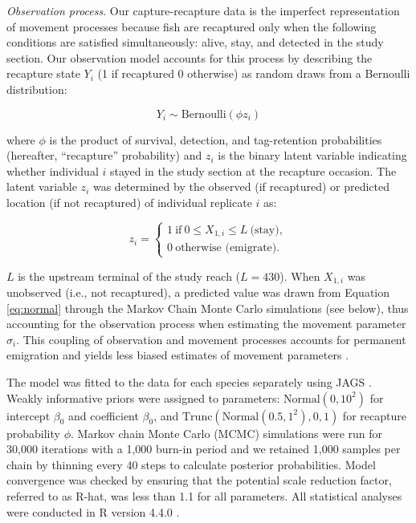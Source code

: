 \documentclass[11pt, class=article, crop=false]{standalone}
\begin{document}
\textit{Observation process}. Our capture-recapture data is the imperfect representation of movement processes because fish are recaptured only when the following conditions are satisfied simultaneously: alive, stay, and detected in the study section. Our observation model accounts for this process by describing the recapture state $Y_i$ (1 if recaptured 0 otherwise) as random draws from a Bernoulli distribution:

\begin{equation}
    Y_i \sim \text{Bernoulli}(\phi z_i)
\end{equation}

where $\phi$ is the product of survival, detection, and tag-retention probabilities (hereafter, ``recapture'' probability) and $z_i$ is the binary latent variable indicating whether individual $i$ stayed in the study section at the recapture occasion.
The latent variable $z_i$ was determined by the observed (if recaptured) or predicted location (if not recaptured) of individual replicate $i$ as: 

\begin{equation}
    z_i =
    \begin{cases}
        1~\text{if}~0 \le X_{1,i} \le L~\text{(stay)},\\
        0~\text{otherwise (emigrate)}.
    \end{cases}
\end{equation}

$L$ is the upstream terminal of the study reach ($L = 430$). When $X_{1,i}$ was unobserved (i.e., not recaptured), a predicted value was drawn from Equation \ref{eq:normal} through the Markov Chain Monte Carlo simulations (see below), thus accounting for the observation process when estimating the movement parameter $\sigma_i$.
This coupling of observation and movement processes accounts for permanent emigration and yields less biased estimates of movement parameters \citep{teruiModelingDispersalUsing2020}.

The model was fitted to the data for each species separately using JAGS \citep{plummerJAGSProgramAnalysis2003}. Weakly informative priors were assigned to parameters: $\text{Normal}(0, 10^2)$ for intercept $\beta_0$ and coefficient $\beta_0$, and $\text{Trunc}(\text{Normal}(0.5, 1^2), 0, 1)$ for recapture probability $\phi$. Markov chain Monte Carlo (MCMC) simulations were run for 30,000 iterations with a 1,000 burn-in period and we retained 1,000 samples per chain by thinning every 40 steps to calculate posterior probabilities. Model convergence was checked by ensuring that the potential scale reduction factor, referred to as R-hat, was less than 1.1 for all parameters. All statistical analyses were conducted in R version 4.4.0 \citep{rcoreteamLanguageEnvironmentStatistical2021}.
\end{document}
